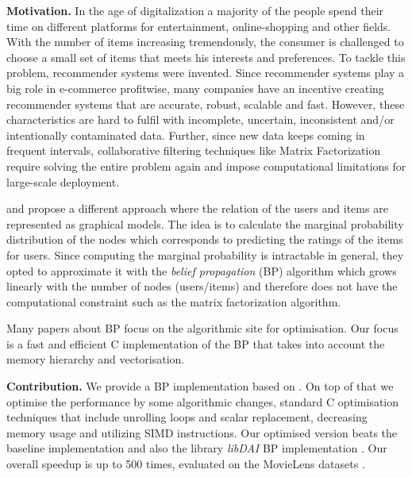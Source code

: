 \documentclass[letterpaper]{article}
\newcommand{\mypar}[1]{{\bf #1.}}
\begin{document}
\mypar{Motivation}
In the age of digitalization a majority of the people spend their time on different platforms for entertainment, online-shopping and other fields. With the number of items increasing tremendously, the consumer is challenged to choose a small set of items that meets his interests and preferences. To tackle this problem, recommender systems were invented. Since recommender systems play a big role in e-commerce profitwise, many companies have an incentive creating recommender systems that are accurate, robust, scalable and fast. However, these characteristics are hard to fulfil with incomplete, uncertain, inconsistent and/or intentionally contaminated data. Further, since new data keeps coming in frequent intervals, collaborative filtering techniques like Matrix Factorization require solving the entire problem again and impose computational limitations for large-scale deployment.

\citet{BPRS} and \citet{top-n-recommendation} propose a different approach where the relation of the users and items are represented as graphical models. The idea is to calculate the marginal probability distribution of the nodes which corresponds to predicting the ratings of the items for users. Since computing the marginal probability is intractable in general, they opted to approximate it with the \emph{belief propagation} (BP) algorithm which grows linearly with the number of nodes (users/items) and therefore does not have the computational constraint such as the matrix factorization algorithm.

Many papers about BP focus on the algorithmic site for optimisation. Our focus is a fast and efficient C implementation of the BP that takes into account the memory hierarchy and vectorisation.

\mypar{Contribution}
We provide a BP implementation based on \citet{top-n-recommendation}. On top of that we optimise the performance by some algorithmic changes, standard C optimisation techniques that include unrolling loops and scalar replacement, decreasing memory usage and utilizing SIMD instructions. Our optimised version beats the baseline implementation and also the library \emph{libDAI} BP implementation \cite{libdai}. Our overall speedup is up to 500 times, evaluated on the MovieLens datasets \cite{movieLens}.
\end{document}

